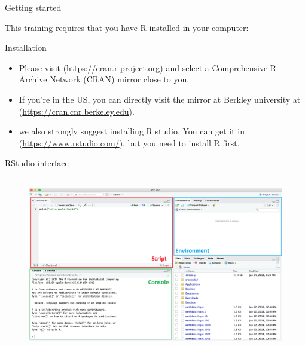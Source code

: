 \documentclass[ignorenonframetext,]{beamer}
\begin{document}
\begin{frame}{Getting started}

This training requires that you have R installed in your computer:

\begin{block}{Installation}

\begin{itemize}
\item
  Please visit (\url{https://cran.r-project.org}) and select a
  Comprehensive R Archive Network (CRAN) mirror close to you.
\item
  If you're in the US, you can directly visit the mirror at Berkley
  university at (\url{https://cran.cnr.berkeley.edu}).
\item
  we also strongly suggest installing R studio. You can get it in
  (\url{https://www.rstudio.com/}), but you need to install R first.
\end{itemize}

\end{block}

\end{frame}

\begin{frame}{RStudio interface}

\begin{figure}
\centering
  \includegraphics[width=12cm,height=7.7cm]{img/interface.png}
\end{figure}

\end{frame}
\end{document}
